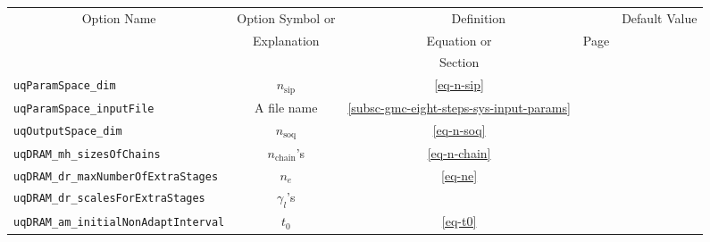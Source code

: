 \begin{sidewaystable}[h]
\begin{center}
\begin{tabular}{|l|c|c|c|c|}
\hline
\multicolumn{1}{|c|}{Option Name}        & Option Symbol or                    & \multicolumn{2}{c|}{Definition}                                                                 & Default Value \\
\cline{3-4}
                                         & Explanation                         & Equation or                                  & Page                                             &               \\
                                         &                                     & Section                                      &                                                  &               \\
\hline
\verb=uqParamSpace_dim=                  & $n_{\text{sip}}$                    & \eqref{eq-n-sip}                             & \pageref{eq-n-sip}                               &               \\
\hline
\verb=uqParamSpace_inputFile=            & A file name                         & \ref{subsc-gmc-eight-steps-sys-input-params} & \pageref{subsc-gmc-eight-steps-sys-input-params} &               \\
\hline
\verb=uqOutputSpace_dim=                 & $n_{\text{soq}}$                    & \eqref{eq-n-soq}                             & \pageref{eq-n-soq}                               &               \\
\hline
\verb=uqDRAM_mh_sizesOfChains=           & $n_{\text{chain}}$'s                & \eqref{eq-n-chain}                           & \pageref{eq-n-chain}                             &               \\
\hline
\verb=uqDRAM_dr_maxNumberOfExtraStages=  & $n_e$                               & \eqref{eq-ne}                                & \pageref{eq-ne}                                  &               \\
\hline
\verb=uqDRAM_dr_scalesForExtraStages=    & $\gamma_l$'s                        &                                              &                                                  &               \\
\hline
\verb=uqDRAM_am_initialNonAdaptInterval= & $t_0$                               & \eqref{eq-t0}                                & \pageref{eq-t0}                                  &               \\

\end{tabular}
\end{center}
\end{sidewaystable}
